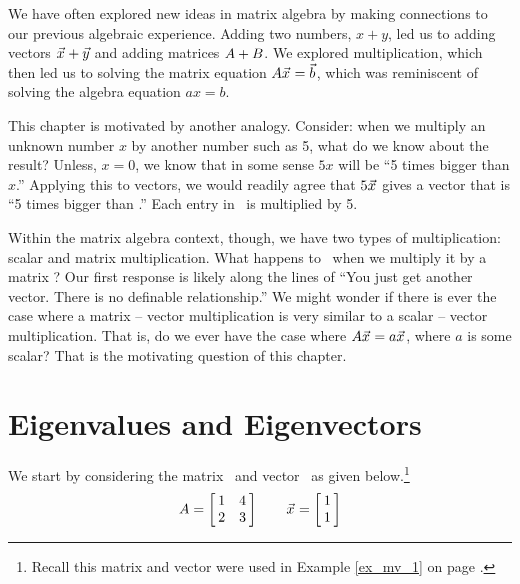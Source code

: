 We have often explored new ideas in matrix algebra by making connections to our previous algebraic experience. Adding two numbers, $x+y$, led us to adding vectors $\vx+\vy$ and adding matrices $\tta+\ttb$. We explored multiplication, which then led us to solving the matrix equation $\ttaxb$, which was reminiscent of solving the algebra equation $ax=b$. 

This chapter is motivated by another analogy. Consider: when we multiply an unknown number $x$ by another number such as 5, what do we know about the result? Unless, $x=0$, we know that in some sense $5x$ will be ``5 times bigger than $x$.'' Applying this to vectors, we would readily agree that $5\vx$ gives a vector that is ``5 times bigger than \vx.'' Each entry in \vx\ is multiplied by 5.  

Within the matrix algebra context, though, we have two types of multiplication: scalar and matrix multiplication. What happens to \vx\ when we multiply it by a matrix \tta? Our first response is likely along the lines of ``You just get another vector. There is no definable relationship.'' We might wonder %
 if there is ever the case where a matrix -- vector multiplication is very similar to a scalar -- vector multiplication. That is, do we ever have the case where $\tta\vx = a\vx$, where $a$ is some scalar? That is the motivating question of this chapter.

\section{Eigenvalues and Eigenvectors}\label{sec:eigen}


We start by considering the matrix \tta\ and vector \vx\ as given below.\footnote{Recall this matrix and vector were used in Example \ref{ex_mv_1} on page \pageref{ex_mv_1}.} $$\tta = \bmx{cc} 1&4\\2&3\emx \quad \quad \vx = \bmx{c}1\\1\emx$$

